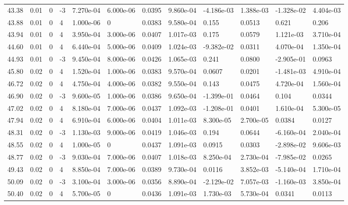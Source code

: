\documentclass[preview]{standalone}
\begin{document}
{{{{\begin{tabular}{L{1.2cm}C{1.2cm} C{0.3cm}C{0.5cm} C{1.4cm}C{1.4cm} C{1.4cm}C{1.4cm} C{1.6cm}C{1.6cm} C{1.6cm}C{1.6cm}}
  43.38  &  0.01  & 0     & -3 &  7.270e-04  & 6.000e-06  &  0.0395&   9.860e-04& -4.186e-03 & 1.388e-03   &  -1.328e-02 & 4.404e-03  \\ 
  43.88  &  0.01  & 0     &  4 &  1.000e-06  & 0  &  0.0383&   9.580e-04& 0.155 & 0.0513   &  0.621 & 0.206  \\ 
  43.94  &  0.01  & 0     &  4 &  3.950e-04  & 3.000e-06  &  0.0407&   1.017e-03& 0.175 & 0.0579   &  1.121e-03 & 3.710e-04  \\ 
  44.60  &  0.01  & 0     &  4 &  6.440e-04  & 5.000e-06  &  0.0409&   1.024e-03& -9.382e-02 & 0.0311   &  4.070e-04 & 1.350e-04  \\ 
  44.93  &  0.01  & 0     & -3 &  9.450e-04  & 8.000e-06  &  0.0426&   1.065e-03& 0.241 & 0.0800   &  -2.905e-01 & 0.0963  \\ 
  45.80  &  0.02  & 0     &  4 &  1.520e-04  & 1.000e-06  &  0.0383&   9.570e-04& 0.0607 & 0.0201   &  -1.481e-03 & 4.910e-04  \\ 
  46.72  &  0.02  & 0     &  4 &  4.750e-04  & 4.000e-06  &  0.0382&   9.550e-04& 0.143 & 0.0475   &  4.720e-04 & 1.560e-04  \\ 
  46.90  &  0.02  & 0     & -3 &  9.600e-05  & 1.000e-06  &  0.0386&   9.650e-04& -1.399e-01 & 0.0464   &  0.104 & 0.0344  \\ 
  47.02  &  0.02  & 0     &  4 &  8.180e-04  & 7.000e-06  &  0.0437&   1.092e-03& -1.208e-01 & 0.0401   &  1.610e-04 & 5.300e-05  \\ 
  47.94  &  0.02  & 0     &  4 &  6.910e-04  & 6.000e-06  &  0.0404&   1.011e-03& 8.300e-05 & 2.700e-05   &  0.0384 & 0.0127  \\ 
  48.31  &  0.02  & 0     & -3 &  1.130e-03  & 9.000e-06  &  0.0419&   1.046e-03& 0.194 & 0.0644   &  -6.160e-04 & 2.040e-04  \\ 
  48.55  &  0.02  & 0     &  4 &  1.000e-05  & 0  &  0.0437&   1.091e-03& 0.0915 & 0.0303   &  -2.898e-02 & 9.606e-03  \\ 
  48.77  &  0.02  & 0     & -3 &  9.030e-04  & 7.000e-06  &  0.0407&   1.018e-03& 8.250e-04 & 2.730e-04   &  -7.985e-02 & 0.0265  \\ 
  49.43  &  0.02  & 0     &  4 &  8.850e-04  & 7.000e-06  &  0.0389&   9.730e-04& 0.0116 & 3.852e-03   &  -5.140e-04 & 1.710e-04  \\ 
  50.09  &  0.02  & 0     & -3 &  3.100e-04  & 3.000e-06  &  0.0356&   8.890e-04& -2.129e-02 & 7.057e-03   &  -1.160e-03 & 3.850e-04  \\ 
  50.40  &  0.02  & 0     &  4 &  5.700e-05  & 0  &  0.0436&   1.091e-03& 1.730e-03 & 5.730e-04   &  0.0341 & 0.0113  \\ 

\end{tabular}}}}}
\end{document}
